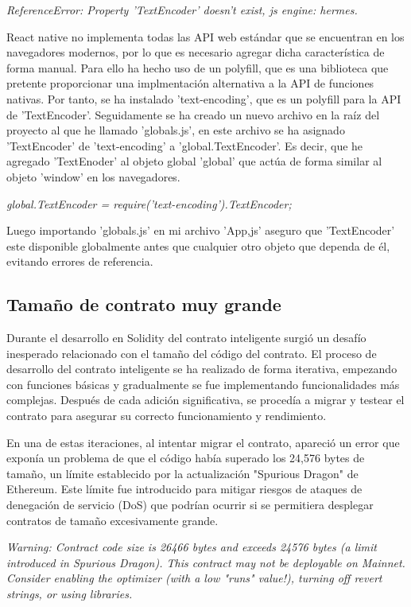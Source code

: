 \textit{ReferenceError: Property 'TextEncoder' doesn't exist, js engine: hermes.}

React native no implementa todas las API web estándar que se encuentran en los navegadores modernos, por lo que es necesario agregar dicha característica de forma manual. Para ello ha hecho uso de un polyfill, que es una biblioteca que pretente proporcionar una implmentación alternativa a la API de funciones nativas.
Por tanto, se ha instalado 'text-encoding', que es un polyfill para la API de 'TextEncoder'.
Seguidamente se ha creado un nuevo archivo en la raíz del proyecto al que he llamado 'globals.js', en este archivo se ha asignado 'TextEncoder' de 'text-encoding' a 'global.TextEncoder'. Es decir, que he agregado 'TextEnoder' al objeto global 'global' que actúa de forma similar al objeto 'window' en los navegadores.

\textit{global.TextEncoder = require('text-encoding').TextEncoder;}

Luego importando 'globals.js' en mi archivo 'App,js' aseguro que 'TextEncoder' este disponible globalmente antes que cualquier otro objeto que dependa de él, evitando errores de referencia.


\subsection{Tamaño de contrato muy grande}

Durante el desarrollo en Solidity del contrato inteligente surgió un desafío inesperado relacionado con el tamaño del código del contrato.
El proceso de desarrollo del contrato inteligente se ha realizado de forma iterativa, empezando con funciones básicas y gradualmente se fue implementando funcionalidades más complejas. Después de cada adición significativa, se procedía a migrar y testear el contrato para asegurar su correcto funcionamiento y rendimiento.

En una de estas iteraciones, al intentar migrar el contrato, apareció un error que exponía un problema de que el código había superado los 24,576 bytes de tamaño, un límite establecido por la actualización "Spurious Dragon" de Ethereum. Este límite fue introducido para mitigar riesgos de ataques de denegación de servicio (DoS) que podrían ocurrir si se permitiera desplegar contratos de tamaño excesivamente grande.

\textit{Warning: Contract code size is 26466 bytes and exceeds 24576 bytes (a limit introduced in Spurious Dragon). This contract may not be deployable on Mainnet. Consider enabling the optimizer (with a low "runs" value!), turning off revert strings, or using libraries.}

